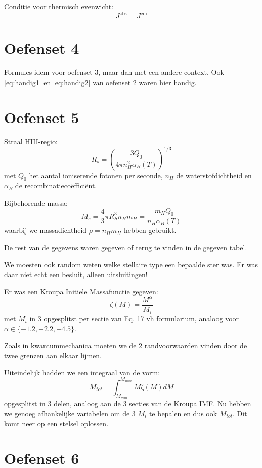 \documentclass[a4paper,twoside]{article}
\theoremstyle{definition}
\theoremstyle{plain}
\begin{document}
Conditie voor thermisch evenwicht:
\begin{equation}
    J^\text{abs} = J^\text{em}
\end{equation}

\section{Oefenset 4}

Formules idem voor oefenset 3, maar dan met een andere context.
Ook \eqref{eq:handig1} en \eqref{eq:handig2} van oefenset 2 waren hier handig.


\section{Oefenset 5}

Straal HIII-regio:
\begin{equation}
    R_s = \left( \frac{3 Q_0}{4 \pi n_H^2 \alpha_B (T)} \right)^{1/3}
\end{equation}
met \(Q_0\) het aantal ioniserende fotonen per seconde, \(n_H\) de waterstofdichtheid en \(\alpha_B\) de recombinatiecoëfficiënt.

Bijbehorende massa:
\begin{equation}
    M_s = \frac{4}{3} \pi R_S^3 n_H m_H = \frac{m_H Q_0}{n_H \alpha_B (T)}
\end{equation}
waarbij we massadichtheid \(\rho = n_H m_H\) hebben gebruikt.

De rest van de gegevens waren gegeven of terug te vinden in de gegeven tabel.

We moesten ook random weten welke stellaire type een bepaalde ster was.
Er was daar niet echt een besluit, alleen uitsluitingen!

Er was een Kroupa Initiele Massafunctie gegeven:
\[
\zeta (M) = \frac{M^\alpha}{M_i}
\]
met \(M_i\) in 3 opgesplitst per sectie van Eq. 17 vh formularium, analoog voor \(\alpha \in \{-1.2, -2.2, -4.5\}\).

Zoals in kwantummechanica moeten we de 2 randvoorwaarden vinden door de twee grenzen aan elkaar lijmen.

Uiteindelijk hadden we een integraal van de vorm:
\[
M_{tot} = \int_{M_{min}}^{M_{max}}  M \zeta (M) dM
\]
opgesplitst in 3 delen, analoog aan de 3 secties van de Kroupa IMF.
Nu hebben we genoeg afhankelijke variabelen om de 3 \(M_i\) te bepalen en dus ook \(M_{tot}\).
Dit komt neer op een stelsel oplossen.
\section{Oefenset 6}
\end{document}
